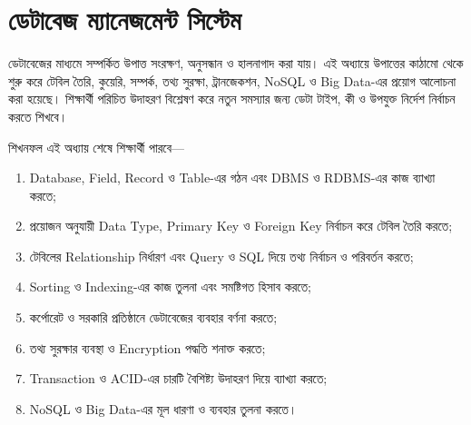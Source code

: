 \ifdefined\chSixStandaloneLayout\else
  
  \chSixNarrowGeometry{\newgeometry}
\fi
\begingroup

\setlength{\headwidth}{\textwidth}
\setlength{\topsep}{2pt}
\setlength{\partopsep}{0pt}
\captionsetup{hypcap=false}
\setlength{\tabcolsep}{3pt}
\renewcommand{\arraystretch}{1.10}
\setlength{\abovedisplayskip}{4pt}
\setlength{\belowdisplayskip}{4pt}
\setlength{\abovedisplayshortskip}{2pt}
\setlength{\belowdisplayshortskip}{2pt}
\setcounter{secnumdepth}{2}
\setcounter{tocdepth}{1}
\setlength{\columnsep}{5mm}
\setlength{\parskip}{1pt}
\setlength{\multicolsep}{0pt}
\raggedcolumns
\let\chSixOriginalMulticols\multicols
\def\multicols{\par\nointerlineskip\chSixOriginalMulticols}
\setlength{\maxbalancingoverflow}{0pt}
\renewcommand{\tablename}{সারণি}
\chapter{ডেটাবেজ ম্যানেজমেন্ট সিস্টেম}

ডেটাবেজের মাধ্যমে সম্পর্কিত উপাত্ত সংরক্ষণ, অনুসন্ধান ও হালনাগাদ করা যায়। এই অধ্যায়ে উপাত্তের কাঠামো থেকে শুরু করে টেবিল তৈরি, কুয়েরি, সম্পর্ক, তথ্য সুরক্ষা, ট্রানজেকশন, NoSQL ও Big Data-এর প্রয়োগ আলোচনা করা হয়েছে। শিক্ষার্থী পরিচিত উদাহরণ বিশ্লেষণ করে নতুন সমস্যার জন্য ডেটা টাইপ, কী ও উপযুক্ত নির্দেশ নির্বাচন করতে শিখবে।

\begin{keypointbox}{শিখনফল}
এই অধ্যায় শেষে শিক্ষার্থী পারবে—
\begin{enumerate}
\item Database, Field, Record ও Table-এর গঠন এবং DBMS ও RDBMS-এর কাজ ব্যাখ্যা করতে;
\item প্রয়োজন অনুযায়ী Data Type, Primary Key ও Foreign Key নির্বাচন করে টেবিল তৈরি করতে;
\item টেবিলের Relationship নির্ধারণ এবং Query ও SQL দিয়ে তথ্য নির্বাচন ও পরিবর্তন করতে;
\item Sorting ও Indexing-এর কাজ তুলনা এবং সমষ্টিগত হিসাব করতে;
\item কর্পোরেট ও সরকারি প্রতিষ্ঠানে ডেটাবেজের ব্যবহার বর্ণনা করতে;
\item তথ্য সুরক্ষার ব্যবস্থা ও Encryption পদ্ধতি শনাক্ত করতে;
\item Transaction ও ACID-এর চারটি বৈশিষ্ট্য উদাহরণ দিয়ে ব্যাখ্যা করতে;
\item NoSQL ও Big Data-এর মূল ধারণা ও ব্যবহার তুলনা করতে।
\end{enumerate}
\end{keypointbox}

